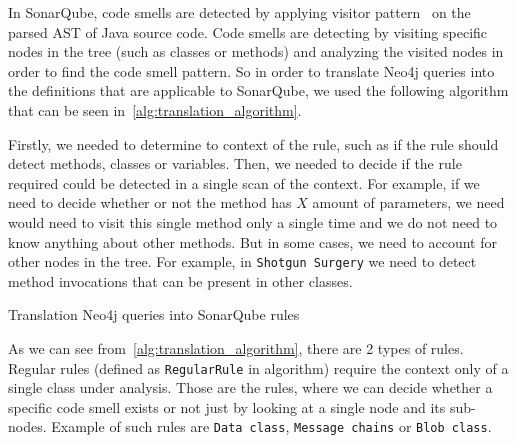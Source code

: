 In SonarQube, code smells are detected by applying visitor pattern~\cite{visitor_pattern} on the parsed
AST of Java source code.
Code smells are detecting by visiting specific nodes in the tree (such as classes or methods) and analyzing
the visited nodes in order to find the code smell pattern.
So in order to translate Neo4j queries into the definitions that are applicable to SonarQube, we used the following
algorithm that can be seen in~\ref{alg:translation_algorithm}.

Firstly, we needed to determine to context of the rule, such as if the rule should detect methods, classes or variables.
Then, we needed to decide if the rule required could be detected in a single scan of the context.
For example, if we need to decide whether or not the method has $X$ amount of parameters, we need would need to visit
this single method only a single time and we do not need to know anything about other methods.
But in some cases, we need to account for other nodes in the tree.
For example, in \verb|Shotgun Surgery| we need to detect method invocations that can be present in other classes.

\begin{algorithm} [!htb]
    \caption{Translation Neo4j queries into SonarQube rules}
    \label{alg:translation_algorithm}
    \BlankLine

\end{algorithm}

As we can see from~\ref{alg:translation_algorithm}, there are 2 types of rules.
Regular rules (defined as \verb|RegularRule| in algorithm) require the context only of a single class under analysis.
Those are the rules, where we can decide whether a specific code smell exists or not just by looking at a single node
and its sub-nodes.
Example of such rules are \verb|Data class|, \verb|Message chains| or \verb|Blob class|.

